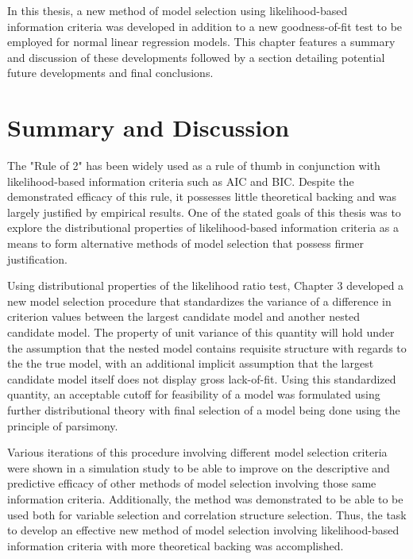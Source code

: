 \doublespace
{}

		In this thesis, a new method of model selection using likelihood-based information criteria was developed in addition to a new goodness-of-fit test
		to be employed for normal linear regression models. This chapter features a summary and discussion of these developments followed by a section
		detailing potential future developments and final conclusions. 

		\section{Summary and Discussion}

		The "Rule of 2" has been widely used as a rule of thumb in conjunction with likelihood-based information criteria such as AIC and BIC. Despite the
		demonstrated efficacy of this rule, it possesses little theoretical backing and was largely justified by empirical results. One of the stated
		goals of this thesis was to explore the distributional properties of likelihood-based information criteria as a means to form alternative methods of
		model selection that possess firmer justification.
		
		Using distributional properties of the likelihood ratio test, Chapter 3 developed a new model selection procedure that standardizes the variance of
		a difference in criterion values between the largest candidate model and another nested candidate model. The property of unit variance of this
		quantity will hold under the assumption that the nested model contains requisite structure with regards to the the true model, with an additional
		implicit assumption that the largest candidate model itself does not display gross lack-of-fit. Using this standardized quantity, an acceptable
		cutoff for feasibility of a model was formulated using further distributional theory with final selection of a model being done using the principle
		of parsimony.

		Various iterations of this procedure involving different model selection criteria were shown in a simulation study to be able to improve on the descriptive
		and predictive efficacy of other methods of model selection involving those same information criteria.  Additionally, the method was demonstrated to
		be able to be used both for variable selection and correlation structure selection. Thus, the task to develop an effective new method of model selection
		involving likelihood-based information criteria with more theoretical backing was accomplished.

